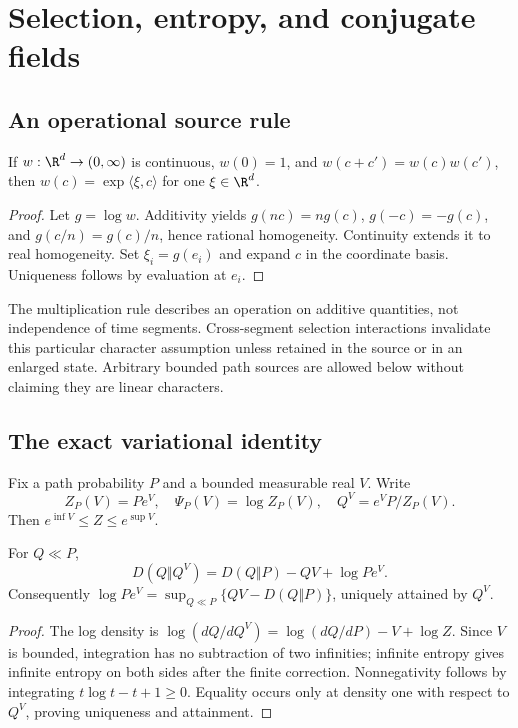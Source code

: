 \section{Selection, entropy, and conjugate fields}\label{sec:selection}
\subsection{An operational source rule}
\begin{theorem}\label{thm:character}
If $w:\R^d\to(0,\infty)$ is continuous, $w(0)=1$, and
$w(c+c')=w(c)w(c')$, then $w(c)=\exp\langle\xi,c\rangle$ for one $\xi\in\R^d$.
\end{theorem}
\begin{proof}
Let $g=\log w$. Additivity yields $g(nc)=ng(c)$, $g(-c)=-g(c)$, and $g(c/n)=g(c)/n$, hence rational homogeneity. Continuity extends it to real homogeneity. Set $\xi_i=g(e_i)$ and expand $c$ in the coordinate basis. Uniqueness follows by evaluation at $e_i$.
\end{proof}

The multiplication rule describes an operation on additive quantities, not independence of time segments. Cross-segment selection interactions invalidate this particular character assumption unless retained in the source or in an enlarged state. Arbitrary bounded path sources are allowed below without claiming they are linear characters.

\subsection{The exact variational identity}
Fix a path probability $P$ and a bounded measurable real $V$. Write
\[
 Z_P(V)=Pe^V,\quad\Psi_P(V)=\log Z_P(V),\quad Q^V=e^VP/Z_P(V).
\]
Then $e^{\inf V}\le Z\le e^{\sup V}$.

\begin{theorem}\label{thm:gibbs}
For $Q\ll P$,
\begin{equation}
 D(Q\Vert Q^V)=D(Q\Vert P)-QV+\log Pe^V.
 \label{eq:gibbs-gap}
\end{equation}
Consequently
$\log Pe^V=\sup_{Q\ll P}\{QV-D(Q\Vert P)\}$, uniquely attained by $Q^V$.
\end{theorem}
\begin{proof}
The log density is $\log(dQ/dQ^V)=\log(dQ/dP)-V+\log Z$. Since $V$ is bounded, integration has no subtraction of two infinities; infinite entropy gives infinite entropy on both sides after the finite correction. Nonnegativity follows by integrating $t\log t-t+1\ge0$. Equality occurs only at density one with respect to $Q^V$, proving uniqueness and attainment.
\end{proof}

